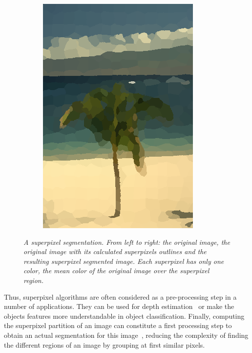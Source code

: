 \documentclass{article}
\begin{document}
\begin{figure}[!ht]
\begin{subfigure}{.3\linewidth}
            \includegraphics[width=0.9\linewidth]{pics/img_spp3.png}
        \end{subfigure}
            \caption{\textit{A superpixel segmentation. From left to right: the original image, the original image with its calculated superpixels outlines and the resulting superpixel segmented image. Each superpixel has only one color, the mean color of the original image over the superpixel region.}}
            \label{fig:spp}
        \end{figure}

        Thus, superpixel algorithms are often considered as a pre-processing step in a number of applications. They can be used for depth estimation~\cite{zitnick2007} or make the objects features more understandable in object classification. Finally, computing the superpixel partition of an image can constitute a first processing step to obtain an actual segmentation for this image~\cite{fulkerson2009}, reducing the complexity of finding the different regions of an image by grouping at first similar pixels.
\end{document}

